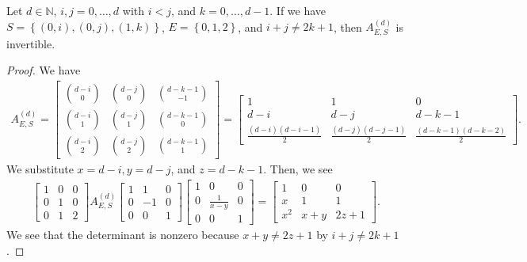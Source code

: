\begin{proposition}\label{prop:impossible-support-2324223423123123}
    Let \( d \in \mathbb{N} \), \( i,j=0, \dots, d \) with \( i < j \), and \( k=0, \dots, d-1 \). If we have \( S = \left\{ (0,i), (0,j), (1,k) \right\} \), \( E = \left\{ 0,1,2 \right\} \), and \( i+j \neq 2k + 1 \), then \( A^{(d)}_{E,S} \) is invertible.
\end{proposition}

\begin{proof}
    We have 
    \begin{align*}
        A^{(d)}_{E,S} = \begin{bmatrix}
            \binom{d-i}{0} & \binom{d-j}{0} & \binom{d-k-1}{-1} \\
            \binom{d-i}{1} & \binom{d-j}{1} & \binom{d-k-1}{0} \\
            \binom{d-i}{2} & \binom{d-j}{2} & \binom{d-k-1}{1}
        \end{bmatrix} = \begin{bmatrix}
            1 & 1 & 0 \\
            d-i & d-j & d-k-1 \\
            \frac{(d-i)(d-i-1)}{2} & \frac{(d-j)(d-j-1)}{2} & \frac{(d-k-1)(d-k-2)}{2}
        \end{bmatrix}.
    \end{align*}
    We substitute \( x = d-i, y = d-j \), and \( z = d-k-1 \).
    Then, we see 
    \begin{align*}
        \begin{bmatrix}
            1 & 0 & 0 \\
            0 & 1 & 0 \\
            0 & 1 & 2
        \end{bmatrix}
        A^{(d)}_{E,S} \begin{bmatrix}
            1 & 1 & 0 \\
            0 & -1 & 0 \\
            0 & 0 & 1
        \end{bmatrix}
        \begin{bmatrix}
            1 & 0 & 0 \\
            0 & \frac{1}{x-y} & 0 \\
            0 & 0 & 1
        \end{bmatrix} = 
        \begin{bmatrix}
            1 & 0 & 0 \\
            x & 1 & 1 \\
            x^2 & x+y & 2z+1
        \end{bmatrix}.
    \end{align*}
    We see that the determinant is nonzero because \( x + y \neq 2z + 1 \) by \( i+j \neq 2k+1 \).
\end{proof}

